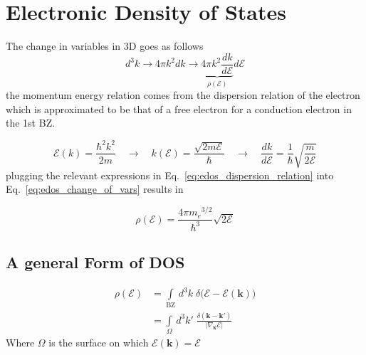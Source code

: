 \newpage
\section{Electronic Density of States}
\label{app:electronic_density_of_states}

The change in variables in 3D goes as follows
\begin{equation}
d^{3}k\to 4\pi k^{2} dk \to \underbrace{ 4\pi k^{2} \frac{dk}{d\mathcal{E}} }_{ \rho(\mathcal{E}) } d\mathcal{E}
\label{eq:edos_change_of_vars}
\end{equation}
the momentum energy relation comes from the dispersion relation of the electron which is approximated to be that of a free electron for a conduction electron in the 1st BZ.

\begin{equation}
\mathcal{E}(k)=\frac{\hbar^{2}k^{2}}{2m}\quad \to \quad k(\mathcal{E}) = \frac{\sqrt{ 2m\mathcal{E} }}{\hbar} \quad \to \quad \frac{dk}{d\mathcal{E}}=\frac{1}{\hbar}\sqrt{ \frac{m}{2\mathcal{E}} } 
\label{eq:edos_dispersion_relation}
\end{equation}
plugging the relevant expressions in Eq.~\eqref{eq:edos_dispersion_relation} into Eq.~\eqref{eq:edos_change_of_vars} results in

\begin{equation}
\rho(\mathcal{E}) = \frac{4\pi {m_e}^{3/2}}{\hbar^3}\sqrt{2\mathcal{E}}
\label{eq:edos_free_electron}
\end{equation}

\subsection{A general Form of DOS}
\begin{align}
\rho(\mathcal{E}) &= \int\limits_{\text{BZ}} \, d^{3}k \; \delta\Big(\mathcal{E}-\mathcal{E}(\mathbf{k})\Big)  \\
&= \int\limits_{\Omega}  \, d^{3}k' \; \frac{\delta(\mathbf{k}-\mathbf{k}')}{|\nabla_{\mathbf{k}} \mathcal{E}|}
\label{eq:edos_general_form}
\end{align}
Where $\Omega$ is the surface on which $\mathcal{E}(\mathbf{k})=\mathcal{E}$
